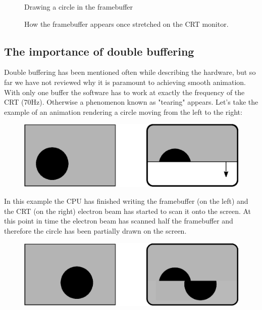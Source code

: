 \documentclass[book.tex]{subfiles}
\begin{document}
\begin{figure}[H]
  \centering
  \caption{Drawing a circle in the framebuffer}
\end{figure}

\begin{figure}[H]
  \centering
  \caption{How the framebuffer appears once stretched on the CRT monitor.}
\end{figure}
\par





\subsection{The importance of double buffering}
Double buffering has been mentioned often while describing the hardware, but so far we have not reviewed why it is paramount to achieving smooth animation. With only one buffer the software has to work at exactly the frequency of the CRT (70Hz). Otherwise a phenomenon known as "tearing" appears. Let's take the example of an animation rendering a circle moving from the left to the right:
\par
\begin{figure}[H]
\centering
\includegraphics[width=\textwidth]{imgs/drawings/doublebuffer_before.eps}
\end{figure}
\par
In this example the CPU has finished writing the framebuffer (on the left) and the CRT (on the right) electron beam has started to scan it onto the screen. At this point in time the electron beam has scanned half the framebuffer and therefore the circle has been partially drawn on the screen.
\par
\begin{figure}[H]
\centering
\includegraphics[width=\textwidth]{imgs/drawings/doublebuffer_after.eps}
\end{figure}
\end{document}
